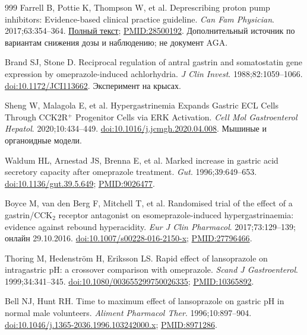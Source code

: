 \documentclass[11pt,a4paper,notitlepage]{report}
\begin{document}
\begin{thebibliography}{999}
 Farrell B, Pottie K, Thompson W, et al. Deprescribing proton pump inhibitors: Evidence-based clinical practice guideline. \textit{Can Fam Physician}. 2017;63:354--364. \href{https://pmc.ncbi.nlm.nih.gov/articles/PMC5429051/}{Полный текст}; \href{https://pubmed.ncbi.nlm.nih.gov/28500192/}{PMID:28500192}. Дополнительный источник по вариантам снижения дозы и наблюдению; не документ AGA.

 Brand SJ, Stone D. Reciprocal regulation of antral gastrin and somatostatin gene expression by omeprazole-induced achlorhydria. \textit{J Clin Invest}. 1988;82:1059--1066. \href{https://doi.org/10.1172/JCI113662}{doi:10.1172/JCI113662}. Эксперимент на крысах.

 Sheng W, Malagola E, et al. Hypergastrinemia Expands Gastric ECL Cells Through CCK2R$^+$ Progenitor Cells via ERK Activation. \textit{Cell Mol Gastroenterol Hepatol}. 2020;10:434--449. \href{https://doi.org/10.1016/j.jcmgh.2020.04.008}{doi:10.1016/j.jcmgh.2020.04.008}. Мышиные и органоидные модели.

 Waldum HL, Arnestad JS, Brenna E, et al. Marked increase in gastric acid secretory capacity after omeprazole treatment. \textit{Gut}. 1996;39:649--653. \href{https://doi.org/10.1136/gut.39.5.649}{doi:10.1136/gut.39.5.649}; \href{https://pubmed.ncbi.nlm.nih.gov/9026477/}{PMID:9026477}.

 Boyce M, van den Berg F, Mitchell T, et al. Randomised trial of the effect of a gastrin/CCK$_2$ receptor antagonist on esomeprazole-induced hypergastrinaemia: evidence against rebound hyperacidity. \textit{Eur J Clin Pharmacol}. 2017;73:129--139; онлайн 29.10.2016. \href{https://doi.org/10.1007/s00228-016-2150-x}{doi:10.1007/s00228-016-2150-x}; \href{https://pubmed.ncbi.nlm.nih.gov/27796466/}{PMID:27796466}.

 Thoring M, Hedenström H, Eriksson LS. Rapid effect of lansoprazole on intragastric pH: a crossover comparison with omeprazole. \textit{Scand J Gastroenterol}. 1999;34:341--345. \href{https://doi.org/10.1080/003655299750026335}{doi:10.1080/003655299750026335}; \href{https://pubmed.ncbi.nlm.nih.gov/10365892/}{PMID:10365892}.

 Bell NJ, Hunt RH. Time to maximum effect of lansoprazole on gastric pH in normal male volunteers. \textit{Aliment Pharmacol Ther}. 1996;10:897--904. \href{https://doi.org/10.1046/j.1365-2036.1996.103242000.x}{doi:10.1046/j.1365-2036.1996.103242000.x}; \href{https://pubmed.ncbi.nlm.nih.gov/8971286/}{PMID:8971286}.


\end{thebibliography}
\end{document}
